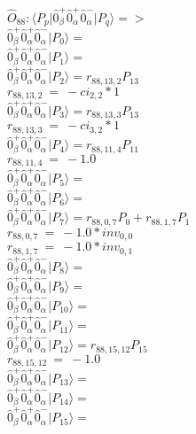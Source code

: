 \documentclass[14pt]{article}
\begin{document}
    $\hat{O}_{88}:  \langle{P_p}\vert \hat{0}_{\beta}^{+}\hat{0}_{\alpha}^{+}\hat{0}_{\alpha}^{-} \vert{P_q}\rangle => $ \\ 
    $ \hat{0}_{\beta}^{+}\hat{0}_{\alpha}^{+}\hat{0}_{\alpha}^{-} \vert{P_{0}}\rangle =  $ \\ 
    $ \hat{0}_{\beta}^{+}\hat{0}_{\alpha}^{+}\hat{0}_{\alpha}^{-} \vert{P_{1}}\rangle =  $ \\ 
    $ \hat{0}_{\beta}^{+}\hat{0}_{\alpha}^{+}\hat{0}_{\alpha}^{-} \vert{P_{2}}\rangle = {r}_{88,13,2}P_{13} $ \\ 
    ${r}_{88,13,2}\ =\ -{ci}_{2,2}*1 $ \\ 
    $ \hat{0}_{\beta}^{+}\hat{0}_{\alpha}^{+}\hat{0}_{\alpha}^{-} \vert{P_{3}}\rangle = {r}_{88,13,3}P_{13} $ \\ 
    ${r}_{88,13,3}\ =\ -{ci}_{3,2}*1 $ \\ 
    $ \hat{0}_{\beta}^{+}\hat{0}_{\alpha}^{+}\hat{0}_{\alpha}^{-} \vert{P_{4}}\rangle = {r}_{88,11,4}P_{11} $ \\ 
    ${r}_{88,11,4}\ =\ -1.0 $ \\ 
    $ \hat{0}_{\beta}^{+}\hat{0}_{\alpha}^{+}\hat{0}_{\alpha}^{-} \vert{P_{5}}\rangle =  $ \\ 
    $ \hat{0}_{\beta}^{+}\hat{0}_{\alpha}^{+}\hat{0}_{\alpha}^{-} \vert{P_{6}}\rangle =  $ \\ 
    $ \hat{0}_{\beta}^{+}\hat{0}_{\alpha}^{+}\hat{0}_{\alpha}^{-} \vert{P_{7}}\rangle = {r}_{88,0,7}P_{0}+{r}_{88,1,7}P_{1} $ \\ 
    ${r}_{88,0,7}\ =\ -1.0*{inv}_{0,0} $ \\ 
    ${r}_{88,1,7}\ =\ -1.0*{inv}_{0,1} $ \\ 
    $ \hat{0}_{\beta}^{+}\hat{0}_{\alpha}^{+}\hat{0}_{\alpha}^{-} \vert{P_{8}}\rangle =  $ \\ 
    $ \hat{0}_{\beta}^{+}\hat{0}_{\alpha}^{+}\hat{0}_{\alpha}^{-} \vert{P_{9}}\rangle =  $ \\ 
    $ \hat{0}_{\beta}^{+}\hat{0}_{\alpha}^{+}\hat{0}_{\alpha}^{-} \vert{P_{10}}\rangle =  $ \\ 
    $ \hat{0}_{\beta}^{+}\hat{0}_{\alpha}^{+}\hat{0}_{\alpha}^{-} \vert{P_{11}}\rangle =  $ \\ 
    $ \hat{0}_{\beta}^{+}\hat{0}_{\alpha}^{+}\hat{0}_{\alpha}^{-} \vert{P_{12}}\rangle = {r}_{88,15,12}P_{15} $ \\ 
    ${r}_{88,15,12}\ =\ -1.0 $ \\ 
    $ \hat{0}_{\beta}^{+}\hat{0}_{\alpha}^{+}\hat{0}_{\alpha}^{-} \vert{P_{13}}\rangle =  $ \\ 
    $ \hat{0}_{\beta}^{+}\hat{0}_{\alpha}^{+}\hat{0}_{\alpha}^{-} \vert{P_{14}}\rangle =  $ \\ 
    $ \hat{0}_{\beta}^{+}\hat{0}_{\alpha}^{+}\hat{0}_{\alpha}^{-} \vert{P_{15}}\rangle =  $ \\ 
    
\end{document}
